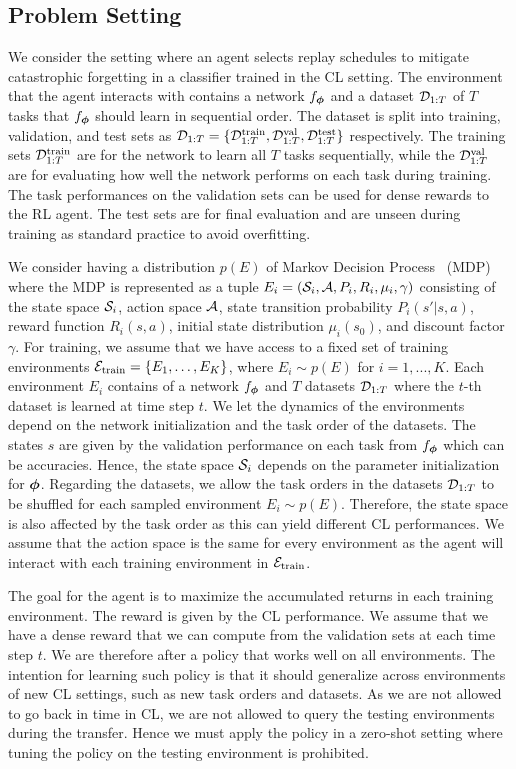   
\subsection{Problem Setting}

We consider the setting where an agent selects replay schedules to mitigate catastrophic forgetting in a classifier trained in the CL setting. The environment that the agent interacts with contains a network $f_{{\bm{\phi}}}$ and a dataset ${\mathcal{D}}_{1:T}$ of $T$ tasks that $f_{{\bm{\phi}}}$ should learn in sequential order. The dataset is split into training, validation, and test sets as ${\mathcal{D}}_{1:T} = \{{\mathcal{D}}_{1:T}^{{\text{train}}}, {\mathcal{D}}_{1:T}^{{\text{val}}}, {\mathcal{D}}_{1:T}^{{\text{test}}}\}$ respectively. The training sets ${\mathcal{D}}_{1:T}^{{\text{train}}}$ are for the network to learn all $T$ tasks sequentially, while the ${\mathcal{D}}_{1:T}^{{\text{val}}}$ are for evaluating how well the network performs on each task during training. The task performances on the validation sets can be used for dense rewards to the RL agent. The test sets are for final evaluation and are unseen during training as standard practice to avoid overfitting.  

We consider having a distribution $p(E)$ of Markov Decision Process~\cite{bellman1957markovian} (MDP) where the MDP is represented as a tuple $E_i = ({\mathcal{S}}_i, {\mathcal{A}}, P_i, R_i, \mu_i, \gamma)$ consisting of the state space ${\mathcal{S}}_i$, action space ${\mathcal{A}}$, state transition probability $P_i(s' | s, a)$, reward function $R_i(s, a)$, initial state distribution $\mu_i(s_0)$, and discount factor $\gamma$. For training, we assume that we have access to a fixed set of training environments ${\mathcal{E}}_{{\text{train}}} = \{E_1, \dots, E_K\}$, where $E_i \sim p(E)$ for $i=1, ..., K$. Each environment $E_i$ contains of a network $f_{{\bm{\phi}}}$ and $T$ datasets ${\mathcal{D}}_{1:T}$ where the $t$-th dataset is learned at time step $t$. We let the dynamics of the environments depend on the network initialization and the task order of the datasets. The states $s$ are given by the validation performance on each task from $f_{{\bm{\phi}}}$ which can be accuracies. Hence, the state space ${\mathcal{S}}_i$ depends on the parameter initialization for ${\bm{\phi}}$. Regarding the datasets, we allow the task orders in the datasets ${\mathcal{D}}_{1:T}$ to be shuffled for each sampled environment $E_i \sim p(E)$. Therefore, the state space is also affected by the task order as this can yield different CL performances. We assume that the action space is the same for every environment as the agent will interact with each training environment in ${\mathcal{E}}_{{\text{train}}}$. 

The goal for the agent is to maximize the accumulated returns in each training environment. The reward is given by the CL performance. We assume that we have a dense reward that we can compute from the validation sets at each time step $t$. We are therefore after a policy that works well on all environments. The intention for learning such policy is that it should generalize across environments of new CL settings, such as new task orders and datasets. As we are not allowed to go back in time in CL, we are not allowed to query the testing environments during the transfer. Hence we must apply the policy in a zero-shot setting where tuning the policy on the testing environment is prohibited.


